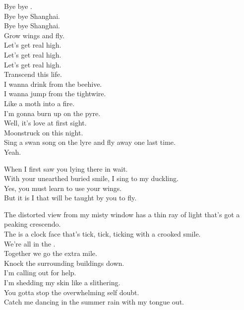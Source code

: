 



Bye bye . \\
Bye bye Shanghai. \\
Bye bye Shanghai. \\
Grow wings and fly. \\
Let's get real high. \\
Let's get real high. \\
Let's get real high. \\
Transcend this life. \\

I wanna drink from the beehive. \\
I wanna jump from the tightwire. \\
Like a moth into a fire. \\
I'm gonna burn up on the pyre. \\
Well, it's love at first sight. \\
Moonstruck on this night. \\
Sing a swan song on the lyre and fly away one last time. \\
Yeah. \\


When I first saw you lying there in wait. \\
With your unearthed buried smile, I sing to my duckling. \\
Yes, you must learn to use your wings. \\
But it is I that will be taught by you to fly. \\


The distorted view from my misty window has a thin ray of light that's got a peaking crescendo. \\
The  is a clock face that's tick, tick, ticking with a crooked smile. \\
We're all in the . \\
Together we go the extra mile. \\

Knock the surrounding buildings down. \\
I'm calling out for help. \\
I'm shedding my skin like a  slithering. \\
You gotta stop the overwhelming self doubt. \\
Catch me dancing in the summer rain with my tongue out. \\
